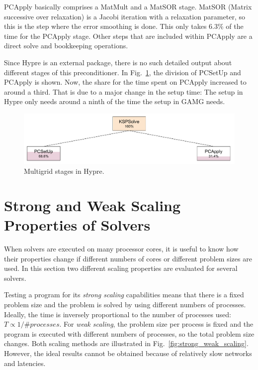 PCApply basically comprises a MatMult and a MatSOR stage. MatSOR (Matrix successive over relaxation) is a Jacobi iteration with a relaxation parameter, so this is the step where the error smoothing is done. This only takes 6.3\% of the time for the PCApply stage. Other steps that are included within PCApply are a direct solve and bookkeeping operations.

Since Hypre is an external package, there is no such detailed output about different stages of this preconditioner. In Fig.~\ref{fig:multigrid_hierarchy_hypre}, the division of PCSetUp and PCApply is shown. Now, the share for the time spent on PCApply increased to around a third. That is due to a major change in the setup time: The setup in Hypre only needs around a ninth of the time the setup in GAMG needs. 

\begin{figure}[tbp]
	\centering
	\includegraphics[width=1.\textwidth]{Multigrid_hierarchy_Hypre}
	\caption{Multigrid stages in Hypre.} 
	\label{fig:multigrid_hierarchy_hypre}
\end{figure}



\section{Strong and Weak Scaling Properties of Solvers}

When solvers are executed on many processor cores, it is useful to know how their properties change if different numbers of cores or different problem sizes are used. In this section two different scaling properties are evaluated for several solvers. 

Testing a program for its \textit{strong scaling} capabilities means that there is a fixed problem size and the problem is solved by using different numbers of processes. Ideally, the time is inversely proportional to the number of processes used: $T \propto 1/\textit{\#processes}$. For \textit{weak scaling}, the problem size per process is fixed and the program is executed with different numbers of processes, so the total problem size changes. Both scaling methods are illustrated in Fig.~\ref{fig:strong_weak_scaling}. However, the ideal results cannot be obtained because of relatively slow networks and latencies.



